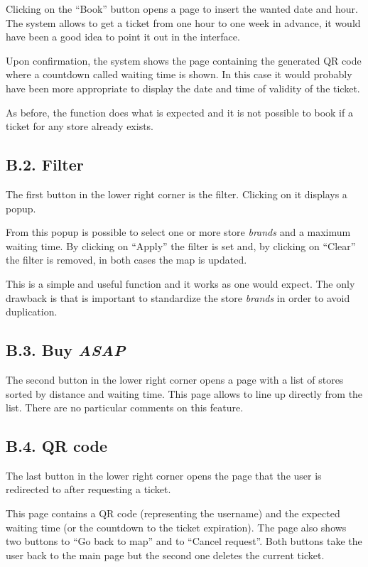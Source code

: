 Clicking on the ``Book'' button opens a page to insert the wanted date and hour. The system allows to get a ticket from one hour to one week in advance, it would have been a good idea to point it out in the interface.

Upon confirmation, the system shows the page containing the generated QR code where a countdown called waiting time is shown.
In this case it would probably have been more appropriate to display the date and time of validity of the ticket.

As before, the function does what is expected and it is not possible to book if a ticket for any store already exists.

\subsection{B.2. Filter}

The first button in the lower right corner is the filter. Clicking on it displays a popup.

From this popup is possible to select one or more store \emph{brands} and a maximum waiting time. By clicking on ``Apply'' the filter is set and, by clicking on ``Clear'' the filter is removed, in both cases the map is updated.

This is a simple and useful function and it works as one would expect. The only drawback is that is important to standardize the store \emph{brands} in order to avoid duplication.

\subsection{B.3. Buy \emph{ASAP}}

The second button in the lower right corner opens a page with a list of stores sorted by distance and waiting time. This page allows to line up directly from the list. There are no particular comments on this feature.

\subsection{B.4. QR code}

The last button in the lower right corner opens the page that the user is redirected to after requesting a ticket.

This page contains a QR code (representing the username) and the expected waiting time (or the countdown to the ticket expiration).
The page also shows two buttons to ``Go back to map'' and to ``Cancel request''. Both buttons take the user back to the main page but the second one deletes the current ticket.

